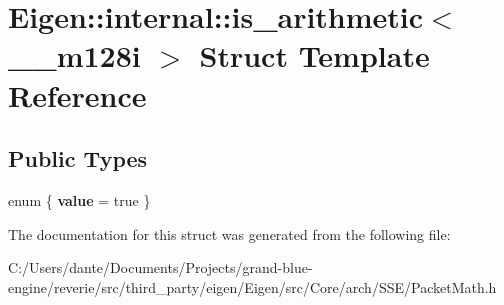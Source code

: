 \hypertarget{struct_eigen_1_1internal_1_1is__arithmetic_3_01____m128i_01_4}{}\section{Eigen\+::internal\+::is\+\_\+arithmetic$<$ \+\_\+\+\_\+m128i $>$ Struct Template Reference}
\label{struct_eigen_1_1internal_1_1is__arithmetic_3_01____m128i_01_4}
\subsection*{Public Types}
\begin{DoxyCompactItemize}
\item 
\mbox{\label{struct_eigen_1_1internal_1_1is__arithmetic_3_01____m128i_01_4_a290334ef16d7b2a4f45291625b33cc5e}} 
enum \{ {\bfseries value} = true
 \}
\end{DoxyCompactItemize}


The documentation for this struct was generated from the following file\+:\begin{DoxyCompactItemize}
\item 
C\+:/\+Users/dante/\+Documents/\+Projects/grand-\/blue-\/engine/reverie/src/third\+\_\+party/eigen/\+Eigen/src/\+Core/arch/\+S\+S\+E/Packet\+Math.\+h\end{DoxyCompactItemize}

